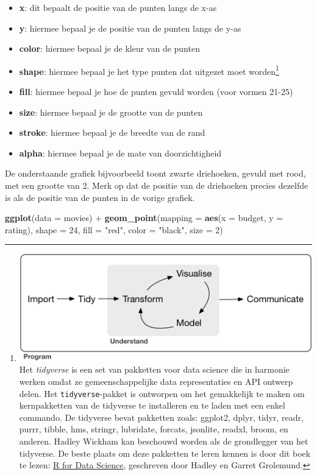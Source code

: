\documentclass[]{tufte-book}
\newenvironment{Shaded}{}{}
\newcommand{\DataTypeTok}[1]{\textcolor[rgb]{0.56,0.13,0.00}{#1}}
\newcommand{\DecValTok}[1]{\textcolor[rgb]{0.25,0.63,0.44}{#1}}
\newcommand{\KeywordTok}[1]{\textcolor[rgb]{0.00,0.44,0.13}{\textbf{#1}}}
\newcommand{\NormalTok}[1]{#1}
\newcommand{\OperatorTok}[1]{\textcolor[rgb]{0.40,0.40,0.40}{#1}}
\newcommand{\StringTok}[1]{\textcolor[rgb]{0.25,0.44,0.63}{#1}}
\providecommand{\tightlist}{%
  \setlength{\itemsep}{0pt}\setlength{\parskip}{0pt}}
\begin{document}
\begin{itemize}
\tightlist
\item
  \textbf{x}: dit bepaalt de positie van de punten langs de x-as
\item
  \textbf{y}: hiermee bepaal je de positie van de punten langs de y-as
\item
  \textbf{color}: hiermee bepaal je de kleur van de punten
\item
  \textbf{shape}: hiermee bepaal je het type punten dat uitgezet moet worden\footnote{\includegraphics{images/tidyverse.png} Het \emph{tidyverse} is een set van pakketten voor data science die in harmonie werken omdat ze gemeenschappelijke data representaties en API ontwerp delen. Het \texttt{tidyverse}-pakket is ontworpen om het gemakkelijk te maken om kernpakketten van de tidyverse te installeren en te laden met een enkel commando. De tidyverse bevat pakketten zoals: ggplot2, dplyr, tidyr, readr, purrr, tibble, hms, stringr, lubridate, forcats, jsonlite, readxl, broom, en anderen. Hadley Wickham kan beschouwd worden als de grondlegger van het tidyverse. De beste plaats om deze pakketten te leren kennen is door dit boek te lezen: \href{http://r4ds.had.co.nz/}{R for Data Science}, geschreven door Hadley en Garret Grolemund.}
\item
  \textbf{fill}: hiermee bepaal je hoe de punten gevuld worden (voor vormen 21-25)
\item
  \textbf{size}: hiermee bepaal je de grootte van de punten
\item
  \textbf{stroke}: hiermee bepaal je de breedte van de rand
\item
  \textbf{alpha}: hiermee bepaal je de mate van doorzichtigheid
\end{itemize}

De onderstaande grafiek bijvoorbeeld toont zwarte driehoeken, gevuld met rood, met een grootte van 2. Merk op dat de positie van de driehoeken precies dezelfde is als de positie van de punten in de vorige grafiek.

\begin{Shaded}
\begin{Highlighting}[]
\KeywordTok{ggplot}\NormalTok{(}\DataTypeTok{data =}\NormalTok{ movies) }\OperatorTok{+}
\StringTok{    }\KeywordTok{geom_point}\NormalTok{(}\DataTypeTok{mapping =} \KeywordTok{aes}\NormalTok{(}\DataTypeTok{x =}\NormalTok{ budget, }\DataTypeTok{y =}\NormalTok{ rating), }
               \DataTypeTok{shape =} \DecValTok{24}\NormalTok{, }
               \DataTypeTok{fill =} \StringTok{"red"}\NormalTok{, }
               \DataTypeTok{color =} \StringTok{"black"}\NormalTok{, }
               \DataTypeTok{size =} \DecValTok{2}\NormalTok{)}
\end{Highlighting}
\end{Shaded}
\end{document}

